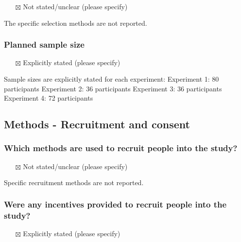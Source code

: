 \documentclass[
  doc, a4paper]{apa7}
\providecommand{\tightlist}{%
  \setlength{\itemsep}{0pt}\setlength{\parskip}{0pt}}
\begin{document}
\begin{itemize}
\tightlist
\item[$\boxtimes$]
  Not stated/unclear (please specify)
\end{itemize}

The specific selection methods are not reported.

\subsubsection{Planned sample size}\label{planned-sample-size}

\begin{itemize}
\tightlist
\item[$\boxtimes$]
  Explicitly stated (please specify)
\end{itemize}

Sample sizes are explicitly stated for each experiment:
Experiment 1: 80 participants
Experiment 2: 36 participants
Experiment 3: 36 participants
Experiment 4: 72 participants

\subsection{Methods - Recruitment and consent}\label{methods---recruitment-and-consent}

\subsubsection{Which methods are used to recruit people into the study?}\label{which-methods-are-used-to-recruit-people-into-the-study}

\begin{itemize}
\tightlist
\item[$\boxtimes$]
  Not stated/unclear (please specify)
\end{itemize}

Specific recruitment methods are not reported.

\subsubsection{Were any incentives provided to recruit people into the study?}\label{were-any-incentives-provided-to-recruit-people-into-the-study}

\begin{itemize}
\tightlist
\item[$\boxtimes$]
  Explicitly stated (please specify)
\end{itemize}
\end{document}
